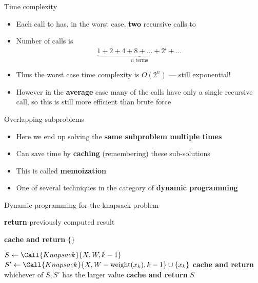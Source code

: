 \begin{frame}{Time complexity}
	\begin{itemize}
		\pause\item Each call to  has, in the worst case, \textbf{two} recursive calls to 
		\pause\item Number of calls is
			$$ \underbrace{1 + 2 + 4 + 8 + \dots + 2^i + \dots}_{\text{$n$ terms}} $$
		\pause\item Thus the worst case time complexity is $O(2^n)$ --- still exponential!
		\pause\item However in the \textbf{average} case many of the calls have only a single recursive call,
			so this is still more efficient than brute force
	\end{itemize}
\end{frame}

\begin{frame}{Overlapping subproblems}
	\begin{itemize}
		\pause\item Here we end up solving the \textbf{same subproblem multiple times}
		\pause\item Can save time by \textbf{caching} (remembering) these sub-solutions
		\pause\item This is called \textbf{memoization}
		\pause\item One of several techniques in the category of \textbf{dynamic programming}
	\end{itemize}
\end{frame}

\begin{frame}{Dynamic programming for the knapsack problem}
    {\small
	\begin{algorithmic}
		\pause{}
			\pause{}
				\pause\State \textbf{return} previously computed result
			\pause\EndIf
			
			\pause{}
				\State \textbf{cache and return} $\{\}$
			\EndIf
			
			\State $S \gets \Call{Knapsack}{X, W, k-1}$
				\State $S' \gets \Call{Knapsack}{X, W - \weight(x_k), k-1} \cup \{x_k\}$
				\State \textbf{cache and return} whichever of $S,S'$ has the larger value
			\Else
				\State \textbf{cache and return} $S$
			\EndIf
		\EndProcedure
	\end{algorithmic}
	}
\end{frame}

